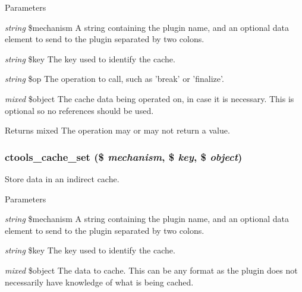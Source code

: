\begin{DoxyParams}{Parameters}
\item[{\em string}]\$mechanism A string containing the plugin name, and an optional data element to send to the plugin separated by two colons.\item[{\em string}]\$key The key used to identify the cache.\item[{\em string}]\$op The operation to call, such as 'break' or 'finalize'.\item[{\em mixed}]\$object The cache data being operated on, in case it is necessary. This is optional so no references should be used.\end{DoxyParams}
\begin{DoxyReturn}{Returns}
mixed The operation may or may not return a value. 
\end{DoxyReturn}
\hypertarget{ctools_2includes_2cache_8inc_a631e9d4813f723aa49a49aa85f8c4c8c}{
\subsubsection[{ctools\_\-cache\_\-set}]{\setlength{\rightskip}{0pt plus 5cm}ctools\_\-cache\_\-set (\$ {\em mechanism}, \/  \$ {\em key}, \/  \$ {\em object})}}
\label{ctools_2includes_2cache_8inc_a631e9d4813f723aa49a49aa85f8c4c8c}
Store data in an indirect cache.


\begin{DoxyParams}{Parameters}
\item[{\em string}]\$mechanism A string containing the plugin name, and an optional data element to send to the plugin separated by two colons.\item[{\em string}]\$key The key used to identify the cache.\item[{\em mixed}]\$object The data to cache. This can be any format as the plugin does not necessarily have knowledge of what is being cached. \end{DoxyParams}
